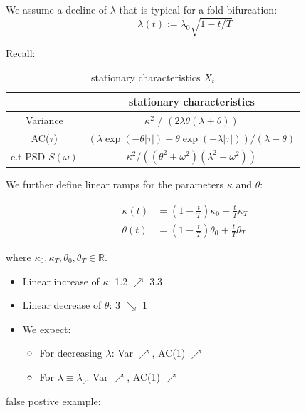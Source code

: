 \documentclass[%
thesis=student,%
coverpage=false,%
titlepage=false,%
headmarks=true, %
german,%
font=libertine, %
math=newpxtx, %
BCOR=5mm,%
coverBCOR=11mm%
]{tumbook}
\begin{document}
We assume a decline of $\lambda$ that is typical for a fold bifurcation: 
    \[
    \lambda(t) := \lambda_{0}\sqrt{1-t/T}
    \]

Recall: 

\begin{table}[h!]
\centering
\begin{tabular}{|c|c|}
\hline
& stationary characteristics\\
\hline
Variance & $\kappa^2$ / $(2\lambda\theta(\lambda + \theta))$\\
AC($\tau$) & $(\lambda\exp(-\theta\lvert\tau\rvert)-\theta\exp(-\lambda\lvert\tau\rvert))/(\lambda - \theta)$\\
c.t PSD $S(\omega)$ & $\kappa^2/((\theta^2 + \omega^2)(\lambda^2 + \omega^2))$\\
\hline
\end{tabular}
\caption{stationary characteristics $X_{t}$}
\label{tab:simple_table}
\end{table}

We further define linear ramps for the parameters $\kappa$ and $\theta$:

\begin{subequations}
    \begin{align*}
        \kappa(t) &= (1-\frac{t}{T})\kappa_{0} + \frac{t}{T}\kappa_{T} \\
        \theta(t) &= (1-\frac{t}{T})\theta_{0} + \frac{t}{T}\theta_{T}
    \end{align*}
\end{subequations}

where $\kappa_{0},\kappa_{T},\theta_{0},\theta_{T} \in \mathbb{R}$.

\begin{itemize}
    \item Linear increase of $\kappa$: 1.2 $\nearrow$ 3.3 
    \item Linear decrease of $\theta$: 3 $\searrow$ 1
    \item We expect: 
    \begin{itemize}
        \item For decreasing $\lambda$: Var $\nearrow$, AC(1) $\nearrow$
        \item For $\lambda \equiv \lambda_{0}$: Var $\nearrow$, AC(1) $\nearrow$
    \end{itemize}
\end{itemize}

false postive example:
\end{document}
